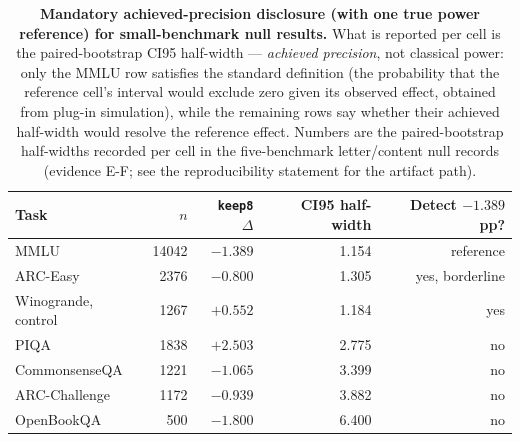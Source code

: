 \begin{table}[!htbp]
\centering
\small
\setlength{\tabcolsep}{4.5pt}
\begin{tabular}{lrrrr}
\toprule
Task & $n$ & \texttt{keep8} $\Delta$ & CI95 half-width & Detect $-1.389$ pp? \\
\midrule
MMLU & 14042 & $-1.389$ & 1.154 & reference \\
ARC-Easy & 2376 & $-0.800$ & 1.305 & yes, borderline \\
Winogrande, control & 1267 & $+0.552$ & 1.184 & yes \\
PIQA & 1838 & $+2.503$ & 2.775 & no \\
CommonsenseQA & 1221 & $-1.065$ & 3.399 & no \\
ARC-Challenge & 1172 & $-0.939$ & 3.882 & no \\
OpenBookQA & 500 & $-1.800$ & 6.400 & no \\
\bottomrule
\end{tabular}
\caption{\textbf{Mandatory achieved-precision disclosure (with one true power reference) for small-benchmark null results.} What is reported per cell is the paired-bootstrap CI95 half-width --- \emph{achieved precision}, not classical power: only the MMLU row satisfies the standard definition (the probability that the reference cell's interval would exclude zero given its observed effect, obtained from plug-in simulation), while the remaining rows say whether their achieved half-width would resolve the reference effect. Numbers are the paired-bootstrap half-widths recorded per cell in the five-benchmark letter/content null records (evidence \textsf{E-F}; see the reproducibility statement for the artifact path).}
\label{tab:power}
\end{table}
